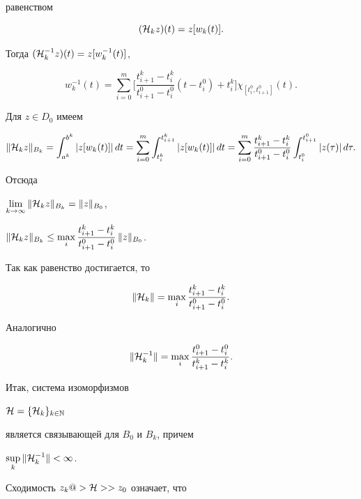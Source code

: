 равенством


\begin{equation}


({\cal H}_k z)(t) = z[w_k(t)].


\end{equation}


Тогда $({\cal H}_k^{-1} z)(t) = z[w_k^{-1}(t)]$,


$$


w_k^{-1}(t)=\sum_{i=0}^m\bigg[\frac{t^k_{i+1}-t^k_i}{t^0_{i+1}-t^0_i}


(t-t^0_i)+t^k_i\bigg] \chi_{[t^0_i,t^0_{i+1}]}(t).


$$


Для $z\in D_0$ имеем


$$


\|{\cal H}_k z\|_{B_k} = \int_{a^k}^{b^k} |z[w_k(t)]|\,dt


= \sum_{i=0}^m\int_{t^k_i}^{t^k_{i+1}}


|z[w_k(t)]|\,dt =


\sum_{i=0}^m\frac{t^k_{i+1}-t^k_i}{t^0_{i+1}-t^0_i}


\int_{t^0_i}^{t^0_{i+1}}|z(\tau)|\,d\tau.


$$


Отсюда


$\lim\limits_{k\to\infty} \|{\cal H}_kz\|_{B_k} = \|z\|_{B_0}$,


$\|{\cal H}_k z\|_{B_k} \leq


\displaystyle\max_i\dfrac{t^k_{i+1}-t^k_i}{t^0_{i+1}-t^0_i}\,


\|z\|_{B_0}$.


Так как равенство достигается, то


$$


\|{\cal H}_k \| = \max_i\frac{t^k_{i+1}-t^k_i}{t^0_{i+1}-t^0_i}.


$$


Аналогично


$$


\|{\cal H}^{-1}_k\| = \max_i\frac{t^0_{i+1}-t^0_i}{t^k_{i+1}-t^k_i}.


$$


Итак, система изоморфизмов


${\cal H} = \{{\cal H}_k\}_{k\in {\Bbb N}}$


является связывающей для $B_0$ и $B_k$, причем


$\sup\limits_k\|{\cal H}_k^{-1}\| < \infty$.


Сходимость $z_k@>{\cal H}>> z_0$ означает, что


$$


